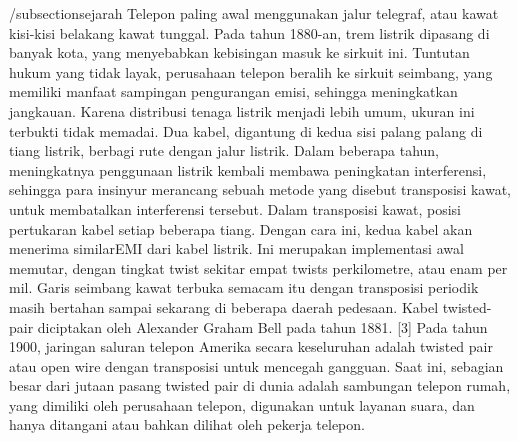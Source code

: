 /subsection{sejarah}
Telepon paling awal menggunakan jalur telegraf, atau kawat kisi-kisi belakang kawat tunggal. Pada tahun 1880-an, trem listrik dipasang di banyak kota, yang menyebabkan kebisingan masuk ke sirkuit ini. Tuntutan hukum yang tidak layak, perusahaan telepon beralih ke sirkuit seimbang, yang memiliki manfaat sampingan pengurangan emisi, sehingga meningkatkan jangkauan. Karena distribusi tenaga listrik menjadi lebih umum, ukuran ini terbukti tidak memadai. Dua kabel, digantung di kedua sisi palang palang di tiang listrik, berbagi rute dengan jalur listrik. Dalam beberapa tahun, meningkatnya penggunaan listrik kembali membawa peningkatan interferensi, sehingga para insinyur merancang sebuah metode yang disebut transposisi kawat, untuk membatalkan interferensi tersebut. Dalam transposisi kawat, posisi pertukaran kabel setiap beberapa tiang. Dengan cara ini, kedua kabel akan menerima similarEMI dari kabel listrik. Ini merupakan implementasi awal memutar, dengan tingkat twist sekitar empat twists perkilometre, atau enam per mil. Garis seimbang kawat terbuka semacam itu dengan transposisi periodik masih bertahan sampai sekarang di beberapa daerah pedesaan. Kabel twisted-pair diciptakan oleh Alexander Graham Bell pada tahun 1881. [3] Pada tahun 1900, jaringan saluran telepon Amerika secara keseluruhan adalah twisted pair atau open wire dengan transposisi untuk mencegah gangguan. Saat ini, sebagian besar dari jutaan pasang twisted pair di dunia adalah sambungan telepon rumah, yang dimiliki oleh perusahaan telepon, digunakan untuk layanan suara, dan hanya ditangani atau bahkan dilihat oleh pekerja telepon.
